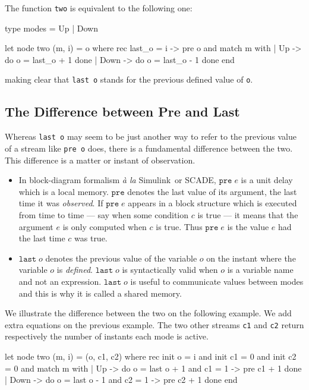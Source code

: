 \documentclass[11pt,titlepage,twoside]{report}
\newcommand{\simulink}{{\sf Simulink}}
\newcommand{\scade}{{\sf SCADE}}
\begin{document}
\medskip\noindent
The function \texttt{two} is equivalent to the following one:
\begin{runverbatim}[hide,label=updownmodes]
type modes = Up | Down
\end{runverbatim}
\begin{runverbatim}[continue]
let node two (m, i) = o where
  rec last_o = i -> pre o
  and match m with
      | Up -> do o = last_o + 1 done
      | Down -> do o = last_o - 1 done
      end
\end{runverbatim}
making clear that \verb-last o- stands for the previous defined value
of \verb-o-.

\subsection{The Difference between Pre and Last} %
Whereas \verb-last o- may seem
to be just another way to refer to the previous value of a stream like
\verb-pre o- does, there is a fundamental difference between the
two. This difference is a matter or instant of observation.

\begin{itemize}
\item
In block-diagram formalism {\em \`a la}
\simulink\ or \scade, $\texttt{pre}\;e$ is a unit delay which
is a local memory. $\texttt{pre}$ denotes the last value of its argument, the
last time it was {\em observed}. If $\texttt{pre}\;e$ appears in a
block structure which is executed from time to time --- say when some condition
$c$ is true --- it means that the argument $e$ is only computed when
$c$ is true. Thus $\texttt{pre}\;e$ is the value $e$ had the last time $c$ was true.
\item
$\texttt{last}\;o$ denotes the previous value of the variable $o$ on
  the instant where the variable $o$ is {\em defined}.
  $\texttt{last}\;o$ is syntactically valid when $o$ is a variable name and
  not an expression.  $\texttt{last}\;o$ is useful to communicate
  values between modes and this is why it is called a shared memory.
\end{itemize}

We illustrate the difference between the two on the following
example. We add extra equations on the previous example. The two other streams
\verb-c1- and \verb-c2-
return respectively the number of instants each mode is active.
\begin{runverbatim}[include=updownmodes]
let node two (m, i) = (o, c1, c2) where
  rec init o = i
  and init c1 = 0
  and init c2 = 0
  and match m with
       | Up -> do o = last o + 1
              and c1 = 1 -> pre c1 + 1
              done
       | Down -> do o = last o - 1
                 and c2 = 1 -> pre c2 + 1
                 done
    end
\end{runverbatim}
\end{document}

